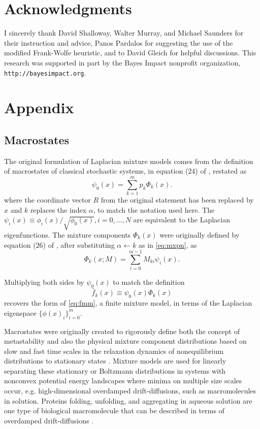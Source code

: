 \documentclass[10pt,letterpaper]{article}
\begin{document}
\section*{Acknowledgments}
I sincerely thank David Shalloway, Walter Murray, and Michael Saunders for their instruction and advice, Panos Pardalos for suggesting the use of the modified Frank-Wolfe heuristic, and to David Gleich for helpful discussions.
This research was supported in part by the Bayes Impact nonprofit organization, \texttt{http://bayesimpact.org}.
\section*{Appendix}
\subsection*{Macrostates}
The original formulation of Laplacian mixture models comes from the definition of macrostates of classical stochastic systems, in equation (24) of \cite[page 9990]{shall96}, restated as
\begin{equation}
\psi_0(x) = \sum_{k = 1}^m p_k \Phi_k(x).\label{eq:mxpn}
\end{equation}
where the coordinate vector $R$ from the original statement has been replaced by $x$ and $k$ replaces the index $\alpha$, to match the notation used here.
The $\psi_i(x) \equiv \phi_i(x) / \sqrt{\phi_0(x)}, i=0, \dots, N$ are equivalent to the Laplacian eigenfunctions.
The mixture components $\Phi_k(x)$ were originally defined by equation (26) of \cite{shall96}, after substituting $\alpha \leftarrow k$ as in \eqref{eq:mxpn}, as
\begin{equation*}
\Phi_k(x; M) = \sum_{i = 0}^{m - 1} M_{k i} \psi_i(x).
\end{equation*}

Multiplying both sides by $\psi_0(x)$ to match the definition
\begin{equation}
  \hat f_k(x) \equiv \psi_0(x) \Phi_k(x) \label{eq:fhatdef}
\end{equation}
recovers the form of \eqref{eq:fmm}, a finite mixture model, in terms of the Laplacian eigenspace $\{\phi(x)_i\}_{i = 0}^m$.

Macrostates were originally created to rigorously define both the concept of metastability and also the physical mixture component distributions based on slow and fast time scales in the relaxation dynamics of nonequilibrium distributions to stationary states \cite{shall96}.
Mixture models are used for linearly separating these stationary or Boltzmann distributions in systems with nonconvex potential energy landscapes where minima on multiple size scales occur, e.g. high-dimensional overdamped drift-diffusions, such as macromolecules in solution.
Proteins folding, unfolding, and aggregating in aqueous solution are one type of biological macromolecule that can be described in terms of overdamped drift-diffusions \cite{shall96}.
\end{document}
